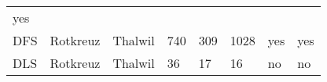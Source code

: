 \documentclass[11pt]{article}
\begin{document}
\begin{longtable}[]{@{}llllllll@{}}
\begin{minipage}[t]{0.09\columnwidth}
yes\strut
\end{minipage}\tabularnewline
\begin{minipage}[t]{0.11\columnwidth}\raggedright
DFS\strut
\end{minipage} & \begin{minipage}[t]{0.11\columnwidth}\raggedright
Rotkreuz\strut
\end{minipage} & \begin{minipage}[t]{0.09\columnwidth}\raggedright
Thalwil\strut
\end{minipage} & \begin{minipage}[t]{0.09\columnwidth}\raggedright
740\strut
\end{minipage} & \begin{minipage}[t]{0.09\columnwidth}\raggedright
309\strut
\end{minipage} & \begin{minipage}[t]{0.09\columnwidth}\raggedright
1028\strut
\end{minipage} & \begin{minipage}[t]{0.09\columnwidth}\raggedright
yes\strut
\end{minipage} & \begin{minipage}[t]{0.09\columnwidth}\raggedright
yes\strut
\end{minipage}\tabularnewline
\begin{minipage}[t]{0.11\columnwidth}\raggedright
DLS\strut
\end{minipage} & \begin{minipage}[t]{0.11\columnwidth}\raggedright
Rotkreuz\strut
\end{minipage} & \begin{minipage}[t]{0.09\columnwidth}\raggedright
Thalwil\strut
\end{minipage} & \begin{minipage}[t]{0.09\columnwidth}\raggedright
36\strut
\end{minipage} & \begin{minipage}[t]{0.09\columnwidth}\raggedright
17\strut
\end{minipage} & \begin{minipage}[t]{0.09\columnwidth}\raggedright
16\strut
\end{minipage} & \begin{minipage}[t]{0.09\columnwidth}\raggedright
no\strut
\end{minipage} & \begin{minipage}[t]{0.09\columnwidth}\raggedright
no\strut
\end{minipage}\tabularnewline

\end{longtable}
\end{document}
